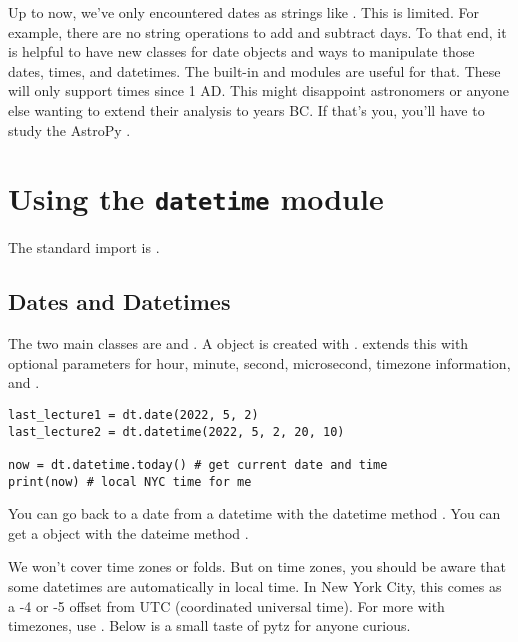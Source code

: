 
\noindent {}


Up to now, we've only encountered dates as strings like . This is limited. For example, there are no string operations to add and subtract days. To that end, it is helpful to have new classes for date objects and ways to manipulate those dates, times, and datetimes. The built-in  and  modules are useful for that. These will only support times since 1 AD. This might disappoint astronomers or anyone else wanting to extend their analysis to years BC. If that's you, you'll have to study the AstroPy .

\section{Using the \texttt{datetime} module}

The standard import is . 

\subsection{Dates and Datetimes}
The two main classes are  and . A  object is created with .  extends this with optional parameters for hour, minute, second, microsecond, timezone information, and . 

\begin{lstlisting}
last_lecture1 = dt.date(2022, 5, 2)
last_lecture2 = dt.datetime(2022, 5, 2, 20, 10)

now = dt.datetime.today() # get current date and time
print(now) # local NYC time for me
\end{lstlisting}

You can go back to a date from a datetime with the datetime method . You can get a  object with the dateime method . 

We won't cover time zones or folds. But on time zones, you should be aware that some datetimes are automatically in local time. In New York City, this comes as a -4 or -5 offset from UTC (coordinated universal time). For more with timezones, use . Below is a small taste of pytz for anyone curious. 

